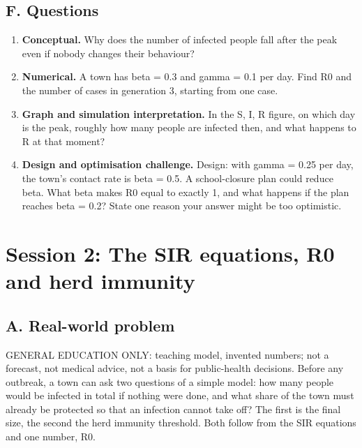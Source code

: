 \documentclass[11pt,a4paper]{article}
\begin{document}
\subsection*{F. Questions}
\begin{enumerate}[nosep]
\item \textbf{Conceptual.} Why does the number of infected people fall after the peak even if nobody changes their behaviour?
\item \textbf{Numerical.} A town has beta = 0.3 and gamma = 0.1 per day. Find R0 and the number of cases in generation 3, starting from one case.
\item \textbf{Graph and simulation interpretation.} In the S, I, R figure, on which day is the peak, roughly how many people are infected then, and what happens to R at that moment?
\item \textbf{Design and optimisation challenge.} Design: with gamma = 0.25 per day, the town's contact rate is beta = 0.5. A school-closure plan could reduce beta. What beta makes R0 equal to exactly 1, and what happens if the plan reaches beta = 0.2? State one reason your answer might be too optimistic.
\end{enumerate}

\section{Session 2: The SIR equations, R0 and herd immunity}

\subsection*{A. Real-world problem}
GENERAL EDUCATION ONLY: teaching model, invented numbers; not a forecast, not medical advice, not a basis for public-health decisions. Before any outbreak, a town can ask two questions of a simple model: how many people would be infected in total if nothing were done, and what share of the town must already be protected so that an infection cannot take off? The first is the final size, the second the herd immunity threshold. Both follow from the SIR equations and one number, R0.
\end{document}
